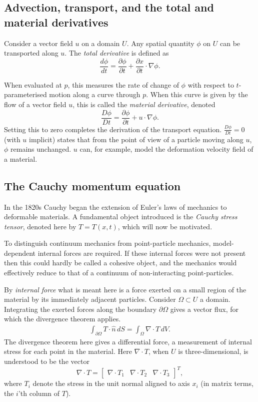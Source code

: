\documentclass{article}
\newcommand{\bb}{\begin{bmatrix}}
\newcommand{\bbe}{\end{bmatrix}}
\begin{document}
\subsection{Advection, transport, and the total and material derivatives} %
Consider a vector field $u$ on a domain $U$. Any spatial quantity $\phi$ on $U$ can be transported along $u$.
The \textit{total derivative} is defined as
    $$\frac{d\phi}{dt} = \frac{\partial \phi}{\partial t} + \frac{\partial x}{\partial t} \cdot \nabla \phi.$$

When evaluated at $p$, this measures the rate of change of $\phi$ with respect to $t$-parameterised motion along a curve through $p$.
When this curve is given by the flow of a vector field $u$, this is called the \textit{material derivative}, denoted
    $$\frac{D\phi}{Dt} = \frac{\partial \phi}{\partial t} + u\cdot \nabla \phi.$$
Setting this to zero completes the derivation of the transport equation. $\frac{D \phi}{Dt} = 0$ (with $u$ implicit) states that from the point of view of
a particle moving along $u$, $\phi$ remains unchanged. $u$ can, for example, model the deformation velocity field of a material.
\subsection{The Cauchy momentum equation} %
In the 1820s Cauchy began the extension of Euler's laws of mechanics to deformable materials.
A fundamental object introduced is the \textit{Cauchy stress tensor}, denoted here by $T = T(x, t)$, which will now be motivated.

To distinguish continuum mechanics from point-particle mechanics, model-dependent internal forces are required. If these internal forces
were not present then this could hardly be called a cohesive object, and the mechanics would effectively reduce to that of a continuum of non-interacting point-particles.

By \textit{internal force} what is meant here is a force exerted on a small region of the material by its immediately adjacent particles.
Consider $\Omega \subset U$ a domain. Integrating the exerted forces along the boundary $\partial\Omega$ gives a vector flux, for which the divergence
theorem applies.
\begin{equation}\label{TDiv}
\begin{split}
    \int_{\partial\Omega} T \cdot \hat{n}\, dS
         = \int_\Omega \nabla \cdot T\, dV.
\end{split}
\end{equation}
The divergence theorem here gives a differential force, a measurement of internal stress for each point in the material.
Here $\nabla \cdot T$, when $U$ is three-dimensional, is understood to be the vector
    $$\nabla \cdot T = \bb \nabla \cdot T_1 & \nabla \cdot T_2 & \nabla \cdot T_3 \bbe^T,$$
where $T_i$ denote the stress in the unit normal aligned to axis $x_i$ (in matrix terms, the $i$'th column of $T$).
\end{document}
